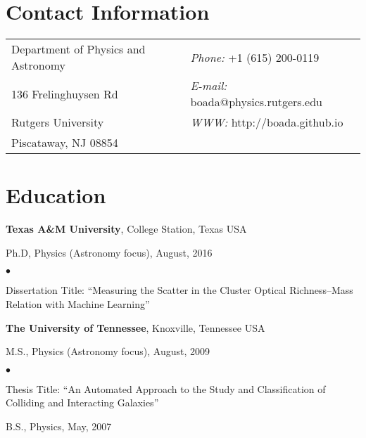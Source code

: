 \documentclass[margin,line, 11pt]{res}
\newenvironment{list1}{
  \begin{list}{\ding{113}}{%
      \setlength{\itemsep}{0in}
      \setlength{\parsep}{0in} \setlength{\parskip}{0in}
      \setlength{\topsep}{0in} \setlength{\partopsep}{0in} 
      \setlength{\leftmargin}{0.17in}}}{\end{list}}
\newenvironment{list2}{
  \begin{list}{$\bullet$}{%
      \setlength{\itemsep}{0in}
      \setlength{\parsep}{0in} \setlength{\parskip}{0in}
      \setlength{\topsep}{0in} \setlength{\partopsep}{0in} 
      \setlength{\leftmargin}{0.2in}}}{\end{list}}
\begin{document}

\begin{resume}
\section{Contact Information}
\begin{tabular}{@{}p{3in}p{3in}}
Department of Physics and Astronomy & {\it Phone:}  +1 (615) 200-0119 \\            
136 Frelinghuysen Rd   & {\it E-mail:}  boada@physics.rutgers.edu \\         
Rutgers University & {\it WWW:} http://boada.github.io \\       
Piscataway, NJ 08854  & \\     
\end{tabular}
\vspace*{-5mm}

\section{Education}
\textbf{Texas A\&M University}, College Station, Texas USA\\
\vspace*{-5mm}
\begin{list1}
	\item[]Ph.D, Physics (Astronomy focus), August, 2016
	\begin{list2}
		\item Dissertation Title: ``Measuring the Scatter in the Cluster Optical Richness--Mass\\ Relation with Machine Learning'' 
	\end{list2}
\end{list1}
\vspace*{-3mm}

\textbf{The University of Tennessee}, Knoxville, Tennessee USA\\
\vspace*{-5mm}
\begin{list1}
	\item[] M.S., Physics (Astronomy focus),  August, 2009
	\begin{list2}
		\item Thesis Title: ``An Automated Approach to the Study and Classification of Colliding and Interacting Galaxies''
	\end{list2}
	\item[] B.S., Physics,  May, 2007
\end{list1}
\vspace*{-3mm}


\end{resume}
\end{document}
